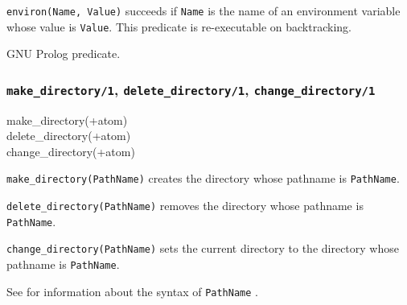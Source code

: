 \texttt{environ(Name, Value)} succeeds if \texttt{Name} is the name of an
environment variable whose value is \texttt{Value}. This predicate is
re-executable on backtracking.

\begin{PlErrors}



\end{PlErrors}

\Portability

GNU Prolog predicate.

\subsubsection{\texttt{make\_directory/1},
               \texttt{delete\_directory/1},
               \texttt{change\_directory/1}}

\begin{TemplatesOneCol}
make\_directory(+atom)\\
delete\_directory(+atom)\\
change\_directory(+atom)

\end{TemplatesOneCol}

\Description

\texttt{make\_directory(PathName)} creates the directory whose pathname is
\texttt{PathName}. 

\texttt{delete\_directory(PathName)} removes the directory whose pathname is
\texttt{PathName}.

\texttt{change\_directory(PathName)} sets the current directory to the
directory whose pathname is \texttt{PathName}.

See  for information about the syntax of
\texttt{PathName} .

\begin{PlErrors}





\end{PlErrors}

